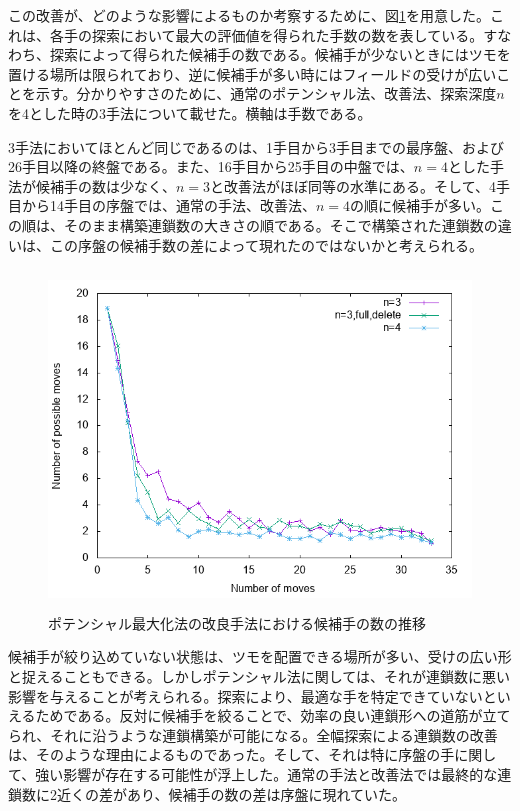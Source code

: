 \documentclass[12pt]{jreport}
\begin{document}
この改善が、どのような影響によるものか考察するために、図\ref{fig:poten_tsumoList}を用意した。これは、各手の探索において最大の評価値を得られた手数の数を表している。すなわち、探索によって得られた候補手の数である。候補手が少ないときにはツモを置ける場所は限られており、逆に候補手が多い時にはフィールドの受けが広いことを示す。分かりやすさのために、通常のポテンシャル法、改善法、探索深度$n$を4とした時の3手法について載せた。横軸は手数である。

3手法においてほとんど同じであるのは、1手目から3手目までの最序盤、および26手目以降の終盤である。また、16手目から25手目の中盤では、$n=4$とした手法が候補手の数は少なく、$n=3$と改善法がほぼ同等の水準にある。そして、4手目から14手目の序盤では、通常の手法、改善法、$n=4$の順に候補手が多い。この順は、そのまま構築連鎖数の大きさの順である。そこで構築された連鎖数の違いは、この序盤の候補手数の差によって現れたのではないかと考えられる。

\begin{figure}[tb]
  \begin{center}
  \includegraphics[height=9cm]{graph/Potential/tsumoList_D3_fulldel_D4.png}
  \caption{ポテンシャル最大化法の改良手法における候補手の数の推移} \label{fig:poten_tsumoList}
\end{center}
\end{figure}

候補手が絞り込めていない状態は、ツモを配置できる場所が多い、受けの広い形と捉えることもできる。しかしポテンシャル法に関しては、それが連鎖数に悪い影響を与えることが考えられる。探索により、最適な手を特定できていないといえるためである。反対に候補手を絞ることで、効率の良い連鎖形への道筋が立てられ、それに沿うような連鎖構築が可能になる。全幅探索による連鎖数の改善は、そのような理由によるものであった。そして、それは特に序盤の手に関して、強い影響が存在する可能性が浮上した。通常の手法と改善法では最終的な連鎖数に2近くの差があり、候補手の数の差は序盤に現れていた。
\end{document}
